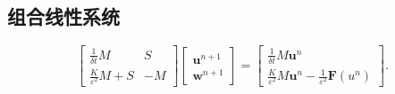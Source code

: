 \documentclass[12pt,a4paper]{article}
\begin{document}
\subsection{组合线性系统}

\[
\begin{bmatrix}
	\frac{1}{\delta t} M & S \\
	\frac{K}{\varepsilon^2} M + S & -M
\end{bmatrix}
\begin{bmatrix}
	\mathbf{u}^{n+1} \\
	\mathbf{w}^{n+1}
\end{bmatrix}
=
\begin{bmatrix}
	\frac{1}{\delta t} M \mathbf{u}^n \\
	\frac{K}{\varepsilon^2} M \mathbf{u}^n - \frac{1}{\varepsilon^2} \mathbf{F}(u^n)
\end{bmatrix}.
\]

%




	
\end{document}
